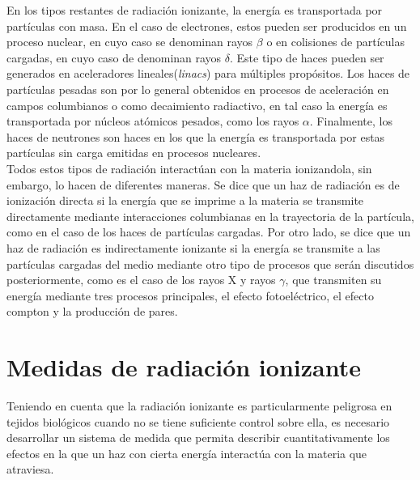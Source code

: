 En los tipos restantes de radiación ionizante, la energía es transportada por partículas con masa. En el caso de electrones, estos pueden ser producidos en un proceso nuclear, en cuyo caso se denominan rayos $\beta$ o en colisiones de partículas cargadas, en cuyo caso de denominan rayos $\delta$. Este tipo de haces pueden ser generados en aceleradores lineales(\textit{linacs}) para múltiples propósitos. Los haces de partículas pesadas son por lo general obtenidos en procesos de aceleración en campos columbianos o como decaimiento radiactivo, en tal caso la energía es transportada por núcleos atómicos pesados, como los rayos $\alpha$. Finalmente, los haces de neutrones son haces en los que la energía es transportada por estas partículas sin carga emitidas en procesos nucleares. \\

Todos estos tipos de radiación interactúan con la materia ionizandola, sin embargo, lo hacen de diferentes maneras. Se dice que un haz de radiación es de ionización directa si la energía que se imprime a la materia se transmite directamente mediante interacciones columbianas en la trayectoria de la partícula, como en el caso de los haces de partículas cargadas. Por otro lado, se dice que un haz de radiación es indirectamente ionizante si la energía se transmite a las partículas cargadas del medio mediante otro tipo de procesos que serán discutidos posteriormente, como es el caso de los rayos X y rayos $\gamma$, que transmiten su energía mediante tres procesos principales, el efecto fotoeléctrico, el efecto compton y la producción de pares.\\

       
\section{Medidas de radiación ionizante}
Teniendo en cuenta que la radiación ionizante es particularmente peligrosa en tejidos biológicos cuando no se tiene suficiente control sobre ella, es necesario desarrollar un sistema de medida que permita describir cuantitativamente los efectos en la que un haz con cierta energía interactúa con la materia que atraviesa.\\

